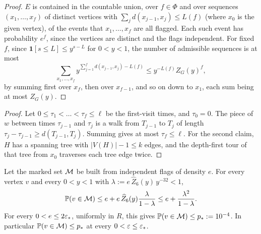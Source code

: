 \begin{proof}
$E$ is contained in the countable union, over $f\in\Phi$ and over sequences $(x_1,\dots,x_f)$ of
distinct vertices with $\sum_jd(x_{j-1},x_j)\le L(f)$ (where $x_0$ is the given vertex), of the
events that $x_1,\dots,x_f$ are all flagged. Each such event has probability $e^f$, since the
vertices are distinct and the flags independent. For fixed $f$, since
$\mathbf 1[s\le L]\le y^{s-L}$ for $0<y<1$, the number of admissible sequences is at most
\[
  \sum_{x_1,\dots,x_f}y^{\sum_{j=1}^fd(x_{j-1},x_j)-L(f)}
  \le y^{-L(f)}Z_G(y)^f,
\]
by summing first over $x_f$, then over $x_{f-1}$, and so on down to $x_1$, each sum being at most
$Z_G(y)$.
\end{proof}


\begin{proof}
Let $0\le\tau_1<\dots<\tau_f\le\ell$ be the first-visit times, and $\tau_0=0$. The piece of $w$
between times $\tau_{j-1}$ and $\tau_j$ is a walk from $T_{j-1}$ to $T_j$ of length
$\tau_j-\tau_{j-1}\ge d(T_{j-1},T_j)$. Summing gives at most $\tau_f\le\ell$. For the second claim,
$H$ has a spanning tree with $|V(H)|-1\le k$ edges, and the depth-first tour of that tree from $x_0$
traverses each tree edge twice.
\end{proof}

\begin{lemma}\label{nw:sparse}
Let the marked set $\mathcal M$ be built from independent flags of density $e$. For every vertex $v$ and every
$0<y<1$ with $\lambda:=e\,\widehat Z_6(y)\,y^{-32}<1$,
\begin{equation}\label{nw:rootbound}
  \mathbb{P}(v\in \mathcal M)\le e+e\,\widehat Z_6(y)\frac{\lambda}{1-\lambda}
  \le e+\frac{\lambda^2}{1-\lambda}.
\end{equation}
For every $0<e\le2\varepsilon_*$, uniformly in $R$, this gives $\mathbb{P}(v\in \mathcal M)\le p_*:=10^{-4}$.
In particular $\mathbb{P}(v\in \mathcal M)\le p_*$ at every $0<\varepsilon\le\varepsilon_*$.
\end{lemma}

